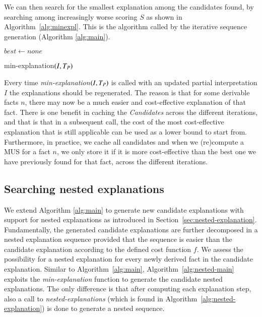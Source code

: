 We can then search for the smallest explanation among the candidates found, by searching among increasingly worse scoring $S$ as shown in Algorithm~\ref{alg:minexpl}. This is the algorithm called by the iterative sequence generation (Algorithm \ref{alg:main}).

\begin{algorithm}


  $\mathit{best}\gets none$\;
  \caption{min-explanation$(I,T_P)$}
  \label{alg:minexpl}
\end{algorithm}

Every time \textit{min-explanation$(I,T_P)$} is called with an updated partial interpretation $I$ the explanations should be regenerated. The reason is that for some derivable facts $n$, there may now be a much easier and cost-effective explanation of that fact.
There is one benefit in caching the \textit{Candidates} across the different iterations, and that is that in a subsequent call, the cost of the most cost-effective explanation that is still applicable can be used as a lower bound to start from.
Furthermore, in practice, we cache all candidates and when we (re)compute a MUS for a fact $n$, we only store it if it is more cost-effective than the best one we have previously found for that fact, across the different iterations.


\subsection{Searching nested explanations}

We extend Algorithm \ref{alg:main} to generate new candidate explanations with support for nested explanations as introduced in Section~\ref{sec:nested-explanation}.
Fundamentally, the generated candidate explanations are further decomposed in a nested explanation sequence provided that the sequence is easier than the candidate explanation according to the defined cost function $f$. 
We assess the possibility for a nested explanation for every newly derived fact in the candidate explanation. 
Similar to Algorithm~\ref{alg:main}, Algorithm~\ref{alg:nested-main} exploits the \textit{min-explanation} function to generate the candidate nested explanations. 
The only difference is that after computing each explanation step, also a call to \textit{nested-explanations} (which is found in Algorithm~\ref{alg:nested-explanation}) is done to generate a nested sequence. 


